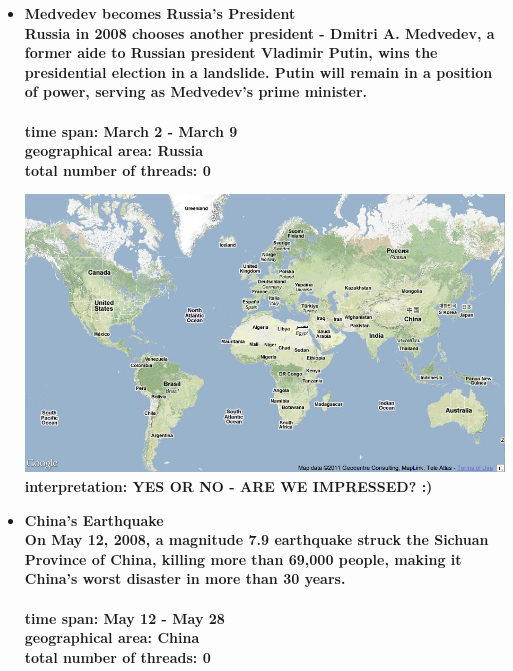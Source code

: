 \documentclass[11pt,a4paper,english]{article}
\begin{document}
\begin{itemize}
					\item \bf Medvedev becomes Russia's President \rm
						\\ Russia in 2008 chooses another president - Dmitri A. Medvedev, a former aide to Russian president Vladimir Putin, wins the presidential election in a landslide. Putin will remain in a position of power, serving as Medvedev's prime minister.
						\\\\ \bf time span: \rm March 2 - March 9
						\\ \bf geographical area: \rm Russia
						\\ \bf total number of threads: \rm 0
						
						\includegraphics[width=130mm]{img/2005-1}
						\bf interpretation: \rm YES OR NO - ARE WE IMPRESSED? :)
					
					
					\item \bf China's Earthquake \rm
						\\On May 12, 2008, a magnitude 7.9 earthquake struck the Sichuan Province of China, killing more than 69,000 people, making it China's worst disaster in more than 30 years.
						\\\\ \bf time span: \rm May 12 - May 28
						\\ \bf geographical area: \rm China
						\\ \bf total number of threads: \rm 0
						

\end{itemize}
\end{document}
